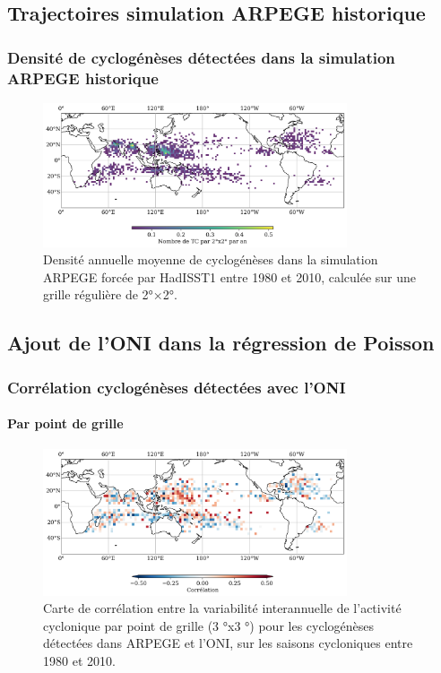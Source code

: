 \documentclass[aspectratio=169, usepdftitle=false, xcolor={dvipsnames}, 9pt,table]{beamer}
\begin{document}
\subsection*{Trajectoires simulation ARPEGE historique}
\begin{frame}[c]
    \frametitle{Densité de cyclogénèses détectées dans la simulation ARPEGE historique}
    \begin{figure}
        \centering
        \includegraphics[width=0.8\textwidth]{Figures/Annexes/track_density_PRE625REFT359x.png}
        \caption{\small Densité annuelle moyenne de cyclogénèses dans la simulation ARPEGE forcée par HadISST1 entre 1980 et 2010, calculée sur une grille régulière de 2°×2°.}
    \end{figure}
    
\end{frame}

\subsection*{Ajout de l'ONI dans la régression de Poisson}
\begin{frame}[c]
    \frametitle{Corrélation cyclogénèses détectées avec l'ONI}
    \framesubtitle{Par point de grille}
    \begin{figure}
        \centering
        \includegraphics[width=0.8\textwidth]{Figures/Annexes/corr_ONI_tracks.png}
        \caption{\small Carte de corrélation entre la variabilité interannuelle de l’activité cyclonique par point de grille (3 °x3 °) pour les cyclogénèses détectées dans ARPEGE et l’ONI, sur les saisons cycloniques entre 1980 et 2010.}
    \end{figure}
\end{frame}
\end{document}

